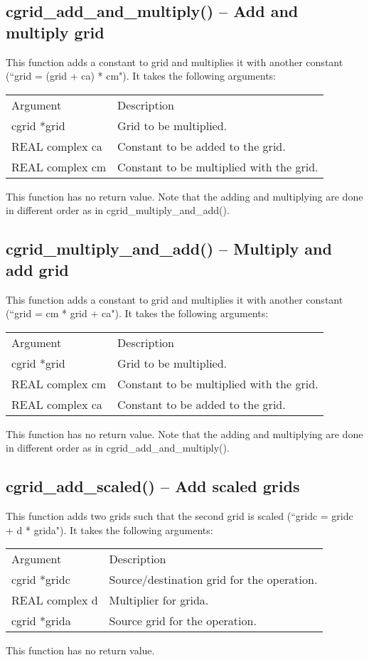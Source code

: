 \documentclass[12pt,letterpaper]{report}
\begin{document}
\subsection{cgrid\_add\_and\_multiply() -- Add and multiply grid}

This function adds a constant to grid and multiplies it with another constant (``grid = (grid + ca) * cm"). It takes the following arguments:
\begin{longtable}{p{} p{}}
Argument & Description\\
\cline{1-2}
cgrid *grid & Grid to be multiplied.\\
REAL complex ca & Constant to be added to the grid.\\
REAL complex cm & Constant to be multiplied with the grid.\\
\end{longtable}
\noindent
This function has no return value. Note that the adding and multiplying are done in different order as in cgrid\_multiply\_and\_add().

\subsection{cgrid\_multiply\_and\_add() -- Multiply and add grid}

This function adds a constant to grid and multiplies it with another constant (``grid = cm * grid + ca"). It takes the following arguments:
\begin{longtable}{p{} p{}}
Argument & Description\\
\cline{1-2}
cgrid *grid & Grid to be multiplied.\\
REAL complex cm & Constant to be multiplied with the grid.\\
REAL complex ca & Constant to be added to the grid.\\
\end{longtable}
\noindent
This function has no return value. Note that the adding and multiplying are done in different order as in cgrid\_add\_and\_multiply().

\subsection{cgrid\_add\_scaled() -- Add scaled grids}

This function adds two grids such that the second grid is scaled (``gridc = gridc + d * grida"). It takes the following arguments:
\begin{longtable}{p{} p{}}
Argument & Description\\
\cline{1-2}
cgrid *gridc & Source/destination grid for the operation.\\
REAL complex d & Multiplier for grida.\\
cgrid *grida & Source grid for the operation.\\
\end{longtable}
\noindent
This function has no return value.
\end{document}
